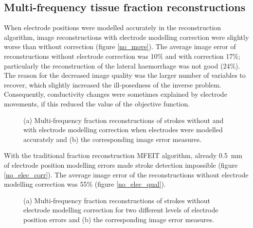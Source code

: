 \subsection{Multi-frequency tissue fraction reconstructions}

When electrode positions were modelled accurately in the reconstruction algorithm, image reconstructions with electrode modelling correction were slightly worse than without correction (figure \ref{no_move}). The average image error of reconstructions without electrode correction was 10\% and with correction 17\%; particularly the reconstruction of the lateral haemorrhage was not good (24\%). The reason for the decreased image quality was the larger number of variables to recover, which slightly increased the ill-posedness of the inverse problem. Consequently, conductivity changes were sometimes explained by electrode movements, if this reduced the value of the objective function.

\begin{figure}[htbp]
\centering
	\hfil
\caption{(a) Multi-frequency fraction reconstructions of strokes without and with electrode modelling correction when electrodes were modelled accurately and (b) the corresponding image error measures.}
\end{figure}

With the traditional fraction reconstruction MFEIT algorithm, already \SI{0.5}{\milli\metre} of electrode position modelling errors made stroke detection impossible (figure \ref{no_elec_corr}). The average image error of the reconstructions without electrode modelling correction was 55\% (figure \ref{no_elec_qual}).

\begin{figure}[htbp]
\centering
	\hfil
\caption{(a) Multi-frequency fraction reconstructions of strokes without electrode modelling correction for two different levels of electrode position errors and (b) the corresponding image error measures.}
\end{figure}

